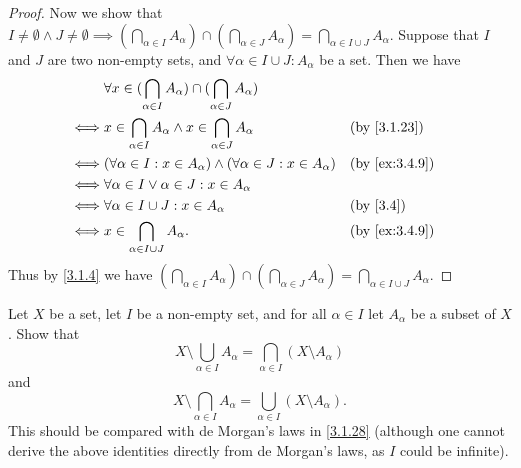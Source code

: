 \begin{proof}
	Now we show that \(I \neq \emptyset \land J \neq \emptyset \implies (\bigcap_{\alpha \in I} A_{\alpha}) \cap (\bigcap_{\alpha \in J} A_{\alpha}) = \bigcap_{\alpha \in I \cup J} A_{\alpha}\).
	Suppose that \(I\) and \(J\) are two non-empty sets, and \(\forall \alpha \in I \cup J : A_{\alpha}\) be a set.
	Then we have
	\begin{align*}
		     & \forall x \in (\bigcap_{\alpha \in I} A_{\alpha}) \cap (\bigcap_{\alpha \in J} A_{\alpha})                    \\
		\iff & x \in \bigcap_{\alpha \in I} A_{\alpha} \land x \in \bigcap_{\alpha \in J} A_{\alpha}      &  & \by{3.1.23}   \\
		\iff & (\forall \alpha \in I : x \in A_{\alpha}) \land (\forall \alpha \in J : x \in A_{\alpha})  &  & \by{ex:3.4.9} \\
		\iff & \forall \alpha \in I \lor \alpha \in J : x \in A_{\alpha}                                                     \\
		\iff & \forall \alpha \in I \cup J : x \in A_{\alpha}                                             &  & \by{3.4}      \\
		\iff & x \in \bigcap_{\alpha \in I \cup J} A_{\alpha}.                                            &  & \by{ex:3.4.9}
	\end{align*}
	Thus by \cref{3.1.4} we have \((\bigcap_{\alpha \in I} A_{\alpha}) \cap (\bigcap_{\alpha \in J} A_{\alpha}) = \bigcap_{\alpha \in I \cup J} A_{\alpha}\).
\end{proof}

\begin{ex}\label{ex:3.4.11}
	Let \(X\) be a set, let \(I\) be a non-empty set, and for all \(\alpha \in I\) let \(A_{\alpha}\) be a subset of \(X\).
	Show that
	\[
		X \setminus \bigcup_{\alpha \in I} A_{\alpha} = \bigcap_{\alpha \in I} (X \setminus A_{\alpha})
	\]
	and
	\[
		X \setminus \bigcap_{\alpha \in I} A_{\alpha} = \bigcup_{\alpha \in I} (X \setminus A_{\alpha}).
	\]
	This should be compared with de Morgan's laws in \cref{3.1.28}
	(although one cannot derive the above identities directly from de Morgan's laws, as \(I\) could be infinite).
\end{ex}

